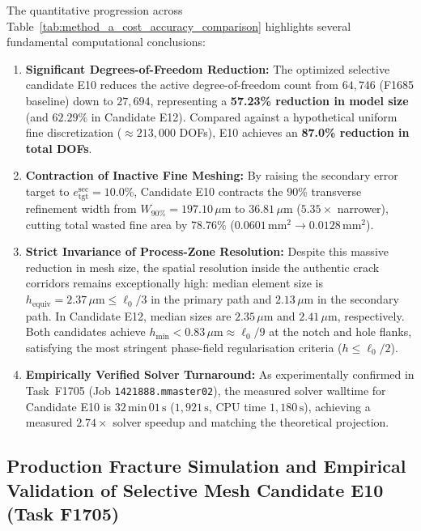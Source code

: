 The quantitative progression across Table~\ref{tab:method_a_cost_accuracy_comparison} highlights several fundamental computational conclusions:
\begin{enumerate}
  \item \textbf{Significant Degrees-of-Freedom Reduction:} The optimized selective candidate E10 reduces the active degree-of-freedom count from $64{,}746$ (F1685 baseline) down to $27{,}694$, representing a \textbf{57.23\% reduction in model size} (and $62.29\%$ in Candidate E12). Compared against a hypothetical uniform fine discretization ($\approx 213{,}000$ DOFs), E10 achieves an \textbf{87.0\% reduction in total DOFs}.
  \item \textbf{Contraction of Inactive Fine Meshing:} By raising the secondary error target to $e_{\mathrm{tgt}}^{\mathrm{sec}} = 10.0\%$, Candidate E10 contracts the 90\% transverse refinement width from $W_{90\%} = 197.10\,\mu\mathrm{m}$ to $36.81\,\mu\mathrm{m}$ ($5.35\times$ narrower), cutting total wasted fine area by $78.76\%$ ($0.0601\,\mathrm{mm}^2 \to 0.0128\,\mathrm{mm}^2$).
  \item \textbf{Strict Invariance of Process-Zone Resolution:} Despite this massive reduction in mesh size, the spatial resolution inside the authentic crack corridors remains exceptionally high: median element size is $h_{\mathrm{equiv}} = 2.37\,\mu\mathrm{m} \le \ell_0/3$ in the primary path and $2.13\,\mu\mathrm{m}$ in the secondary path. In Candidate E12, median sizes are $2.35\,\mu\mathrm{m}$ and $2.41\,\mu\mathrm{m}$, respectively. Both candidates achieve $h_{\min} < 0.83\,\mu\mathrm{m} \approx \ell_0/9$ at the notch and hole flanks, satisfying the most stringent phase-field regularisation criteria ($h \le \ell_0/2$).
  \item \textbf{Empirically Verified Solver Turnaround:} As experimentally confirmed in Task~F1705 (Job \texttt{1421888.mmaster02}), the measured solver walltime for Candidate E10 is $32\,\mathrm{min}\,01\,\mathrm{s}$ ($1{,}921\,\mathrm{s}$, CPU time $1{,}180\,\mathrm{s}$), achieving a measured $2.74\times$ solver speedup and matching the theoretical projection.
\end{enumerate}

\subsection{Production Fracture Simulation and Empirical Validation of Selective Mesh Candidate E10 (Task F1705)}
\label{subsec:f1705_candidate_e10_production}

